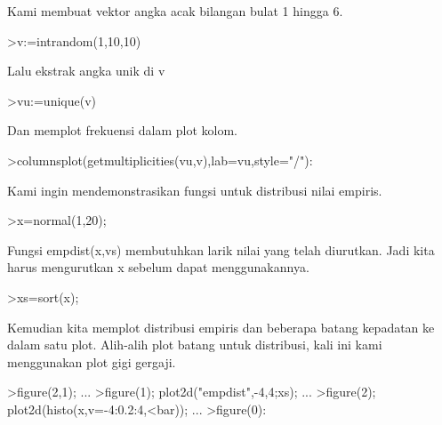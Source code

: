\documentclass{article}
\begin{document}
\begin{eulernotebook}
\begin{eulercomment}
Kami membuat vektor angka acak bilangan bulat 1 hingga 6.
\end{eulercomment}
\begin{eulerprompt}
>v:=intrandom(1,10,10)
\end{eulerprompt}
\begin{euleroutput}
  [8,  5,  8,  8,  6,  8,  8,  3,  5,  5]
\end{euleroutput}
\begin{eulercomment}
Lalu ekstrak angka unik di v
\end{eulercomment}
\begin{eulerprompt}
>vu:=unique(v)
\end{eulerprompt}
\begin{euleroutput}
  [3,  5,  6,  8]
\end{euleroutput}
\begin{eulercomment}
Dan memplot frekuensi dalam plot kolom.
\end{eulercomment}
\begin{eulerprompt}
>columnsplot(getmultiplicities(vu,v),lab=vu,style="/"):
\end{eulerprompt}
\begin{eulercomment}
Kami ingin mendemonstrasikan fungsi untuk distribusi nilai empiris.
\end{eulercomment}
\begin{eulerprompt}
>x=normal(1,20);
\end{eulerprompt}
\begin{eulercomment}
Fungsi empdist(x,vs) membutuhkan larik nilai yang telah diurutkan.
Jadi kita harus mengurutkan x sebelum dapat menggunakannya.
\end{eulercomment}
\begin{eulerprompt}
>xs=sort(x);
\end{eulerprompt}
\begin{eulercomment}
Kemudian kita memplot distribusi empiris dan beberapa batang kepadatan
ke dalam satu plot. Alih-alih plot batang untuk distribusi, kali ini
kami menggunakan plot gigi gergaji.
\end{eulercomment}
\begin{eulerprompt}
>figure(2,1); ...
>figure(1); plot2d("empdist",-4,4;xs); ...
>figure(2); plot2d(histo(x,v=-4:0.2:4,<bar));  ...
>figure(0):
\end{eulerprompt}
\begin{eulercomment}

\end{eulercomment}
\end{eulernotebook}
\end{document}

